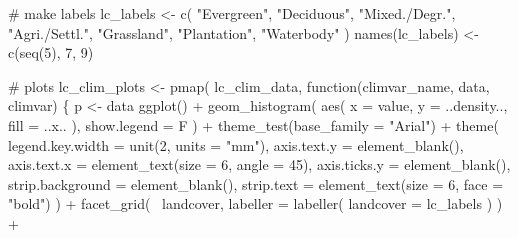 \documentclass[
]{article}
\newenvironment{Shaded}{}{}
\newcommand{\CommentTok}[1]{\textcolor[rgb]{0.00,0.50,0.00}{#1}}
\newcommand{\ControlFlowTok}[1]{\textcolor[rgb]{0.00,0.00,1.00}{#1}}
\newcommand{\DataTypeTok}[1]{#1}
\newcommand{\DecValTok}[1]{#1}
\newcommand{\KeywordTok}[1]{\textcolor[rgb]{0.00,0.00,1.00}{#1}}
\newcommand{\NormalTok}[1]{#1}
\newcommand{\OperatorTok}[1]{#1}
\newcommand{\StringTok}[1]{\textcolor[rgb]{0.00,0.50,0.50}{#1}}
\begin{document}
\begin{Shaded}
\begin{Highlighting}[]
\CommentTok{# make labels}
\NormalTok{lc_labels <-}\StringTok{ }\KeywordTok{c}\NormalTok{(}
  \StringTok{"Evergreen"}\NormalTok{, }\StringTok{"Deciduous"}\NormalTok{,}
  \StringTok{"Mixed./Degr."}\NormalTok{, }\StringTok{"Agri./Settl."}\NormalTok{,}
  \StringTok{"Grassland"}\NormalTok{, }\StringTok{"Plantation"}\NormalTok{,}
  \StringTok{"Waterbody"}
\NormalTok{)}
\KeywordTok{names}\NormalTok{(lc_labels) <-}\StringTok{ }\KeywordTok{c}\NormalTok{(}\KeywordTok{seq}\NormalTok{(}\DecValTok{5}\NormalTok{), }\DecValTok{7}\NormalTok{, }\DecValTok{9}\NormalTok{)}

\CommentTok{# plots}
\NormalTok{lc_clim_plots <-}\StringTok{ }\KeywordTok{pmap}\NormalTok{(}
\NormalTok{  lc_clim_data,}
  \ControlFlowTok{function}\NormalTok{(climvar_name, data, climvar) \{}
\NormalTok{    p <-}\StringTok{ }\NormalTok{data }\OperatorTok{%
\StringTok{      }\KeywordTok{ggplot}\NormalTok{() }\OperatorTok{+}
\StringTok{      }\KeywordTok{geom_histogram}\NormalTok{(}
        \KeywordTok{aes}\NormalTok{(}
          \DataTypeTok{x =}\NormalTok{ value, }\DataTypeTok{y =}\NormalTok{ ..density..,}
          \DataTypeTok{fill =}\NormalTok{ ..x..}
\NormalTok{        ),}
        \DataTypeTok{show.legend =}\NormalTok{ F}
\NormalTok{      ) }\OperatorTok{+}
\StringTok{      }\KeywordTok{theme_test}\NormalTok{(}\DataTypeTok{base_family =} \StringTok{"Arial"}\NormalTok{) }\OperatorTok{+}
\StringTok{      }\KeywordTok{theme}\NormalTok{(}
        \DataTypeTok{legend.key.width =} \KeywordTok{unit}\NormalTok{(}\DecValTok{2}\NormalTok{, }\DataTypeTok{units =} \StringTok{"mm"}\NormalTok{),}
        \DataTypeTok{axis.text.y =} \KeywordTok{element_blank}\NormalTok{(),}
        \DataTypeTok{axis.text.x =} \KeywordTok{element_text}\NormalTok{(}\DataTypeTok{size =} \DecValTok{6}\NormalTok{, }\DataTypeTok{angle =} \DecValTok{45}\NormalTok{),}
        \DataTypeTok{axis.ticks.y =} \KeywordTok{element_blank}\NormalTok{(),}
        \DataTypeTok{strip.background =} \KeywordTok{element_blank}\NormalTok{(),}
        \DataTypeTok{strip.text =} \KeywordTok{element_text}\NormalTok{(}\DataTypeTok{size =} \DecValTok{6}\NormalTok{, }\DataTypeTok{face =} \StringTok{"bold"}\NormalTok{)}
\NormalTok{      ) }\OperatorTok{+}
\StringTok{      }\KeywordTok{facet_grid}\NormalTok{(}
        \OperatorTok{~}\NormalTok{landcover,}
        \DataTypeTok{labeller =} \KeywordTok{labeller}\NormalTok{(}
          \DataTypeTok{landcover =}\NormalTok{ lc_labels}
\NormalTok{        )}
\NormalTok{      ) }\OperatorTok{+}
}
\end{Highlighting}
\end{Shaded}
\end{document}
